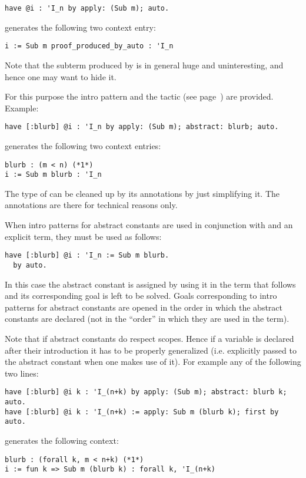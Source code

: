\begin{lstlisting}
have @i : 'I_n by apply: (Sub m); auto.
\end{lstlisting}
generates the following two context entry:
\begin{lstlisting}
i := Sub m proof_produced_by_auto : 'I_n
\end{lstlisting}

Note that the subterm produced by  is in general huge and
uninteresting, and hence one may want to hide it.

For this purpose the \C{[: name ]} intro pattern and the tactic
 (see page~\pageref{ssec:abstract}) are provided.
Example:
\begin{lstlisting}
have [:blurb] @i : 'I_n by apply: (Sub m); abstract: blurb; auto.
\end{lstlisting}
generates the following two context entries:
\begin{lstlisting}
blurb : (m < n) (*1*)
i := Sub m blurb : 'I_n
\end{lstlisting}
The type of  can be cleaned up by its annotations by just simplifying
it.  The annotations are there for technical reasons only.

When intro patterns for abstract constants are used in conjunction
with  and an explicit term, they must be used as follows:

\begin{lstlisting}
have [:blurb] @i : 'I_n := Sub m blurb.
  by auto.
\end{lstlisting}

In this case the abstract constant  is assigned by using it
in the term that follows \C{:=} and its corresponding goal is left to
be solved.  Goals corresponding to intro patterns for abstract constants
are opened in the order in which the abstract constants are declared (not
in the ``order'' in which they are used in the term).

Note that if abstract constants do respect scopes.  Hence if a variable
is declared after their introduction it has to be properly generalized (i.e.
explicitly passed to the abstract constant when one makes use of it).
For example any of the following two lines:
\begin{lstlisting}
have [:blurb] @i k : 'I_(n+k) by apply: (Sub m); abstract: blurb k; auto.
have [:blurb] @i k : 'I_(n+k) := apply: Sub m (blurb k); first by auto.
\end{lstlisting}
generates the following context:
\begin{lstlisting}
blurb : (forall k, m < n+k) (*1*)
i := fun k => Sub m (blurb k) : forall k, 'I_(n+k)
\end{lstlisting}

